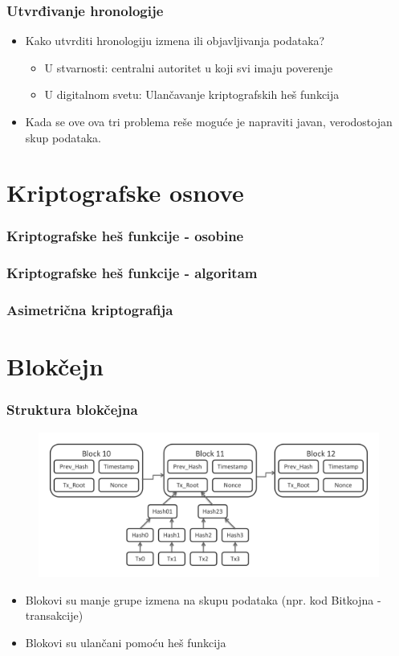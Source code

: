 \documentclass{beamer}
\begin{document}
\begin{frame}[fragile]\frametitle{Utvrđivanje hronologije}
	\begin{itemize}
		\item Kako utvrditi hronologiju izmena ili objavljivanja podataka?
		\begin{itemize}
			\item U stvarnosti: centralni autoritet u koji svi imaju poverenje
			\item U digitalnom svetu: Ulančavanje kriptografskih heš funkcija
		\end{itemize}
		\item Kada se ove ova tri problema reše moguće je napraviti javan, verodostojan skup podataka.
	\end{itemize}
\end{frame}


\section{Kriptografske osnove}

\begin{frame}[fragile]\frametitle{Kriptografske heš funkcije - osobine}
	
\end{frame}

\begin{frame}[fragile]\frametitle{Kriptografske heš funkcije - algoritam}
	
\end{frame}

\begin{frame}[fragile]\frametitle{Asimetrična kriptografija}
	
\end{frame}


\section{Blokčejn}

\begin{frame}[fragile]\frametitle{Struktura blokčejna}
	\begin{figure}[H]
		\includegraphics[scale=0.25]{bitcoin_blockchain_diagram.pdf}
	\end{figure}
	\begin{itemize}
		\item Blokovi su manje grupe izmena na skupu podataka (npr. kod Bitkojna - transakcije)
		\item Blokovi su ulančani pomoću heš funkcija
	\end{itemize}
\end{frame}
\end{document}
